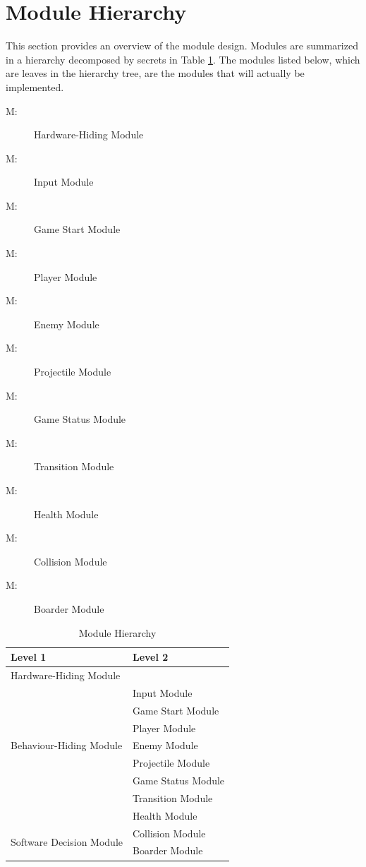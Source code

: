 \documentclass[12pt, titlepage]{article}
\newcounter{mnum}
\newcommand{\mthemnum}{M\themnum}
\begin{document}
\section{Module Hierarchy} \label{SecMH}

This section provides an overview of the module design. Modules are summarized
in a hierarchy decomposed by secrets in Table \ref{TblMH}. The modules listed
below, which are leaves in the hierarchy tree, are the modules that will
actually be implemented.

\begin{description}
\item [ \mthemnum \label{mHH}:] Hardware-Hiding Module
\item [ \mthemnum \label{mInput}:] Input Module
\item [ \mthemnum \label{mGameInit}:] Game Start Module
\item [ \mthemnum \label{mPlayer}:] Player Module
\item [ \mthemnum \label{mEnemy}:] Enemy Module
\item [ \mthemnum \label{mProjectile}:] Projectile Module
\item [ \mthemnum \label{mGameState}:] Game Status Module
\item [ \mthemnum \label{mTransition}:] Transition Module
\item [ \mthemnum \label{mHealth}:] Health Module
\item [ \mthemnum \label{mCollision}:] Collision Module
\item [ \mthemnum \label{mBoarder}:] Boarder Module
\end{description}


\begin{table}[h!]
\centering
\begin{tabular}{p{} p{}}
\toprule
\textbf{Level 1} & \textbf{Level 2}\\
\midrule

{Hardware-Hiding Module} & ~ \\
\midrule

\multirow{7}{0.3\textwidth}{Behaviour-Hiding Module}
& Input Module\\
& Game Start Module\\
& Player Module\\
& Enemy Module\\
& Projectile Module\\
& Game Status Module\\ 
& Transition Module\\
& Health Module\\
\midrule

\multirow{3}{0.3\textwidth}{Software Decision Module}
& Collision Module\\
& Boarder Module\\
\bottomrule

\end{tabular}
\caption{Module Hierarchy}
\label{TblMH}
\end{table}
\end{document}
